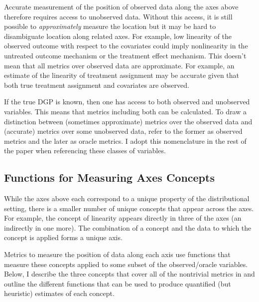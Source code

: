 \documentclass[../main.tex]{subfiles}
\begin{document}
\vspace{\baselineskip}

Accurate measurement of the position of observed data along the axes above therefore requires access to unobserved data. Without this access, it is still possible to \textit{approximately} measure the location but it may be hard to disambiguate location along related axes. For example, low linearity of the observed outcome with respect to the covariates could imply nonlinearity in the untreated outcome mechanism or the treatment effect mechanism. This doesn't mean that all metrics over observed data are approximate. For example, an estimate of the linearity of treatment assignment may be accurate given that both true treatment assignment and covariates are observed.

\vspace{\baselineskip}

If the true DGP is known, then one has access to both observed and unobserved variables. This means that metrics including both can be calculated. To draw a distinction between (sometimes approximate) metrics over the observed data and (accurate) metrics over some unobserved data, \cite{Dorie2019Automated1} refer to the former as observed metrics and the later as oracle metrics. I adopt this nomenclature in the rest of the paper when referencing these classes of variables.

\subsection{Functions for Measuring Axes Concepts}

While the axes above each correspond to a unique property of the distributional setting, there is a smaller number of unique concepts that appear across the axes. For example, the concept of linearity appears directly in three of the axes (an indirectly in one more). The combination of a concept and the data to which the concept is applied forms a unique axis.

\vspace{\baselineskip}

Metrics to measure the position of data along each axis use functions that measure these concepts applied to some subset of the observed/oracle variables. Below, I describe the three concepts that cover all of the nontrivial metrics in \cite{Dorie2019Automated1} and outline the different functions that can be used to produce quantified (but heuristic) estimates of each concept.
\end{document}
